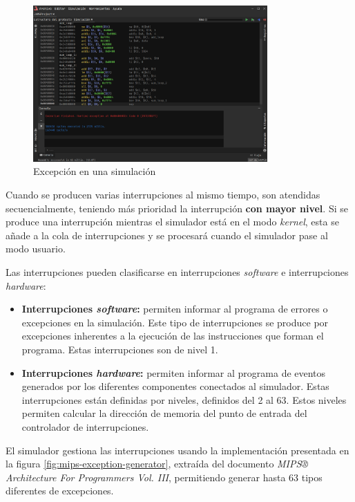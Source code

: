 \begin{figure}[h]
    \centering
    \includegraphics[width=0.8\textwidth]{images/mips/jams-exception}
    \caption{Excepción en una simulación}
    \label{fig:jams-exception}
\end{figure}

Cuando se producen varias interrupciones al mismo tiempo,
son atendidas secuencialmente, teniendo más prioridad
la interrupción \textbf{con mayor nivel}.
Si se produce una interrupción mientras el simulador está en el
modo \textit{kernel}, esta se añade a la cola de interrupciones
y se procesará cuando el simulador pase al modo usuario.

Las interrupciones pueden clasificarse en interrupciones
\textit{software} e interrupciones \textit{hardware}:
\begin{itemize}
    \item \textbf{Interrupciones \textit{software}:} permiten informar
    al programa de errores o excepciones en la simulación.
    Este tipo de interrupciones se produce por excepciones
    inherentes a la ejecución de las instrucciones que forman el programa.
    Estas interrupciones son de nivel 1.
    \item \textbf{Interrupciones \textit{hardware}:} permiten informar
    al programa de eventos generados por los diferentes componentes
    conectados al simulador.
    Estas interrupciones están definidas por
    niveles, definidos del 2 al 63.
    Estos niveles permiten calcular la dirección de memoria
    del punto de entrada del controlador de interrupciones.
\end{itemize}

El simulador gestiona las interrupciones usando la
implementación presentada en la figura \ref{fig:mips-exception-generator},
extraída del documento
\textit{MIPS® Architecture For Programmers Vol. III}\cite{MIPS_VOL_3},
permitiendo generar hasta 63 tipos diferentes de excepciones.

